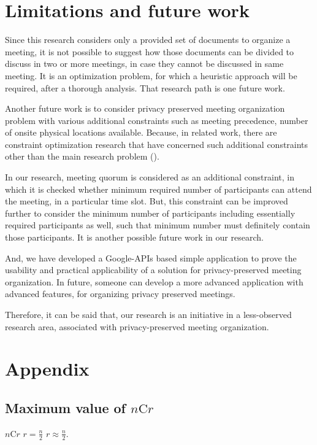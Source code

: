 \section{Limitations and future work}
\indent \par Since this research considers only a provided set of documents to organize a meeting, it is not possible to suggest how those documents can be divided to discuss in two or more meetings, in case they cannot be discussed in same meeting. It is an optimization problem, for which a heuristic approach will be required, after a thorough analysis. That research path is one future work.\\
\par Another future work is to consider privacy preserved meeting organization problem with various additional constraints such as meeting precedence, number of onsite physical locations available. Because, in related work, there are constraint optimization research that have concerned such additional constraints other than the main research problem (\cite{bofill2022}).\\
\par In our research, meeting quorum is considered as an additional constraint, in which it is checked whether minimum required number of participants can attend the meeting, in a particular time slot. But, this constraint can be improved further to consider the minimum number of participants including essentially required participants as well, such that minimum number must definitely contain those participants. It is another possible future work in our research.\\
\par And, we have developed a Google-APIs based simple application to prove the usability and practical applicability of a solution for privacy-preserved meeting organization. In future, someone can develop a more advanced application with advanced features, for organizing privacy preserved meetings.\\
\par Therefore, it can be said that, our research is an initiative in a less-observed research area, associated with privacy-preserved meeting organization.\\

\newpage
\section{Appendix}
\subsection{Maximum value of $n \text{C} r$} \label{proof: maximum value of ncr when n is n/2}
 $n \text{C} r$  $r = \frac{n}{2}$  $r \approx \frac{n}{2}$.

